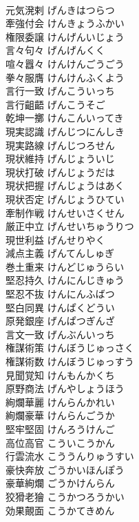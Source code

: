 \documentclass[8pt]{extreport}
\begin{document}
\begin{CJK}{UTF8}{min}
\\	元気溌剌	げんきはつらつ	
\\	牽強付会	けんきょうふかい	
\\	権限委譲	けんげんいじょう	
\\	言々句々	げんげんくく	
\\	喧々囂々	けんけんごうごう	
\\	拳々服膺	けんけんふくよう	
\\	言行一致	げんこういっち	
\\	言行齟齬	げんこうそご	
\\	乾坤一擲	けんこんいってき	
\\	現実認識	げんじつにんしき	
\\	現実路線	げんじつろせん	
\\	現状維持	げんじょういじ	
\\	現状打破	げんじょうだは	
\\	現状把握	げんじょうはあく	
\\	現状否定	げんじょうひてい	
\\	牽制作戦	けんせいさくせん	
\\	厳正中立	げんせいちゅうりつ	
\\	現世利益	げんせりやく	
\\	減点主義	げんてんしゅぎ	
\\	巻土重来	けんどじゅうらい	
\\	堅忍持久	けんにんじきゅう	
\\	堅忍不抜	けんにんふばつ	
\\	堅白同異	けんぱくどうい	
\\	原発銀座	げんぱつぎんざ	
\\	言文一致	げんぶんいっち	
\\	権謀術策	けんぼうじゅっさく	
\\	権謀術数	けんぼうじゅっすう	
\\	見聞覚知	けんもんかくち	
\\	原野商法	げんやしょうほう	
\\	絢爛華麗	けんらんかれい	
\\	絢爛豪華	けんらんごうか	
\\	堅牢堅固	けんろうけんご	
\\	高位高官	こういこうかん	
\\	行雲流水	こううんりゅうすい	
\\	豪快奔放	ごうかいほんぽう	
\\	豪華絢爛	ごうかけんらん	
\\	狡猾老獪	こうかつろうかい	
\\	効果覿面	こうかてきめん	

\end{CJK}
\end{document}

